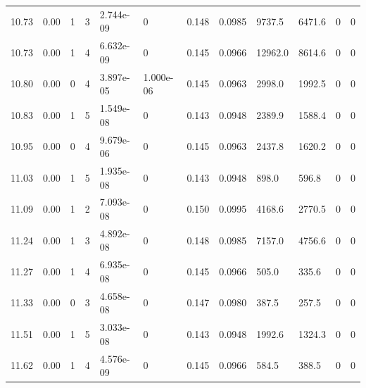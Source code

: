 \documentclass[preview]{standalone}
\begin{document}
{{{{\begin{tabular}{L{1.2cm}C{1.2cm} C{0.3cm}C{0.5cm} C{1.4cm}C{1.4cm} C{1.4cm}C{1.4cm} C{1.6cm}C{1.6cm} C{1.6cm}C{1.6cm}}
  10.73  &  0.00  & 1     &  3 &  2.744e-09  & 0  &  0.148&   0.0985& 9737.5 & 6471.6   &  0 & 0  \\ 
  10.73  &  0.00  & 1     &  4 &  6.632e-09  & 0  &  0.145&   0.0966& 12962.0 & 8614.6   &  0 & 0  \\ 
  10.80  &  0.00  & 0     &  4 &  3.897e-05  & 1.000e-06  &  0.145&   0.0963& 2998.0 & 1992.5   &  0 & 0  \\ 
  10.83  &  0.00  & 1     &  5 &  1.549e-08  & 0  &  0.143&   0.0948& 2389.9 & 1588.4   &  0 & 0  \\ 
  10.95  &  0.00  & 0     &  4 &  9.679e-06  & 0  &  0.145&   0.0963& 2437.8 & 1620.2   &  0 & 0  \\ 
  11.03  &  0.00  & 1     &  5 &  1.935e-08  & 0  &  0.143&   0.0948& 898.0 & 596.8   &  0 & 0  \\ 
  11.09  &  0.00  & 1     &  2 &  7.093e-08  & 0  &  0.150&   0.0995& 4168.6 & 2770.5   &  0 & 0  \\ 
  11.24  &  0.00  & 1     &  3 &  4.892e-08  & 0  &  0.148&   0.0985& 7157.0 & 4756.6   &  0 & 0  \\ 
  11.27  &  0.00  & 1     &  4 &  6.935e-08  & 0  &  0.145&   0.0966& 505.0 & 335.6   &  0 & 0  \\ 
  11.33  &  0.00  & 0     &  3 &  4.658e-08  & 0  &  0.147&   0.0980& 387.5 & 257.5   &  0 & 0  \\ 
  11.51  &  0.00  & 1     &  5 &  3.033e-08  & 0  &  0.143&   0.0948& 1992.6 & 1324.3   &  0 & 0  \\ 
  11.62  &  0.00  & 1     &  4 &  4.576e-09  & 0  &  0.145&   0.0966& 584.5 & 388.5   &  0 & 0  \\ 
\hline 
\end{tabular} 

}}}}
\end{document}
